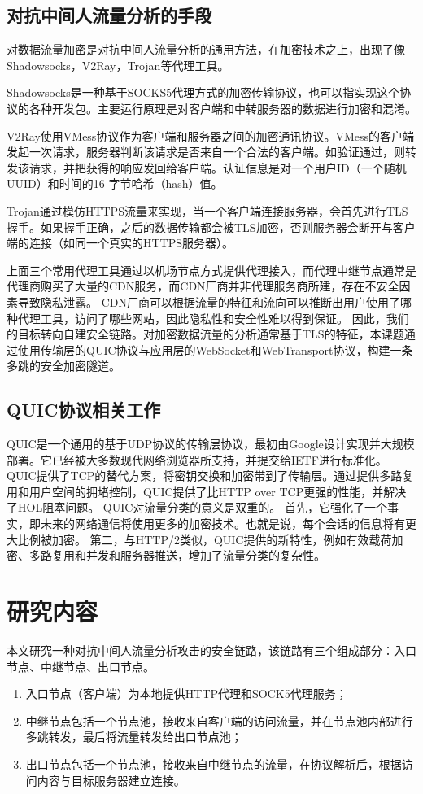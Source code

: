 \subsection{对抗中间人流量分析的手段}
对数据流量加密是对抗中间人流量分析的通用方法，在加密技术之上，出现了像Shadowsocks，V2Ray，Trojan等代理工具。

Shadowsocks\cite{Shadowsocks}是一种基于SOCKS5代理方式的加密传输协议，也可以指实现这个协议的各种开发包。主要运行原理是对客户端和中转服务器的数据进行加密和混淆。

V2Ray使用VMess协议\cite{vmess}作为客户端和服务器之间的加密通讯协议。VMess的客户端发起一次请求，服务器判断该请求是否来自一个合法的客户端。如验证通过，则转发该请求，并把获得的响应发回给客户端。认证信息是对一个用户ID（一个随机UUID）和时间的16 字节哈希（hash）值。

Trojan\cite{trojan}通过模仿HTTPS流量来实现，当一个客户端连接服务器，会首先进行TLS握手。如果握手正确，之后的数据传输都会被TLS加密，否则服务器会断开与客户端的连接（如同一个真实的HTTPS服务器）。

上面三个常用代理工具通过以机场节点方式提供代理接入，而代理中继节点通常是代理商购买了大量的CDN服务，而CDN厂商并非代理服务商所建，存在不安全因素导致隐私泄露。
CDN厂商可以根据流量的特征和流向可以推断出用户使用了哪种代理工具，访问了哪些网站，因此隐私性和安全性难以得到保证。
因此，我们的目标转向自建安全链路。对加密数据流量的分析通常基于TLS的特征，本课题通过使用传输层的QUIC协议与应用层的WebSocket\cite{rfc6455}和WebTransport协议，构建一条多跳的安全加密隧道。

\subsection{QUIC协议相关工作}
QUIC是一个通用的基于UDP协议的传输层协议，最初由Google设计实现并大规模部署\cite{langley2017quic}。它已经被大多数现代网络浏览器所支持，并提交给IETF进行标准化\cite{rfc9000}。
QUIC提供了TCP的替代方案，将密钥交换和加密带到了传输层。通过提供多路复用和用户空间的拥堵控制，QUIC提供了比HTTP over TCP更强的性能，并解决了HOL阻塞问题。
QUIC对流量分类的意义是双重的。
首先，它强化了一个事实，即未来的网络通信将使用更多的加密技术。也就是说，每个会话的信息将有更大比例被加密。
第二，与HTTP/2\cite{rfc7540}类似，QUIC提供的新特性，例如有效载荷加密、多路复用和并发和服务器推送，增加了流量分类的复杂性。


\section{研究内容}
本文研究一种对抗中间人流量分析攻击的安全链路，该链路有三个组成部分：入口节点、中继节点、出口节点。
\begin{enumerate}
  \item 入口节点（客户端）为本地提供HTTP代理和SOCK5代理服务\cite{rfc1928}；
  \item 中继节点包括一个节点池，接收来自客户端的访问流量，并在节点池内部进行多跳转发，最后将流量转发给出口节点池；
  \item 出口节点包括一个节点池，接收来自中继节点的流量，在协议解析后，根据访问内容与目标服务器建立连接。
\end{enumerate}

